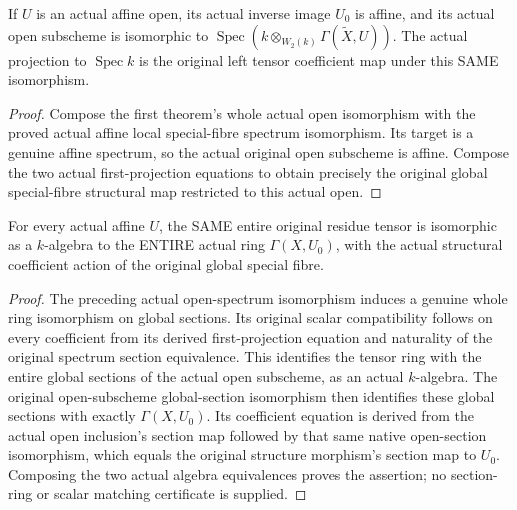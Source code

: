 \begin{theorem}
\label{thm:witt-two-special-fibre-original-affine-open}
\leanok
If $U$ is an actual affine open, its actual inverse image $U_0$
is affine, and its actual open subscheme is isomorphic to
$\operatorname{Spec}(k\otimes_{W_2(k)}\Gamma(\widetilde X,U))$.
The actual projection to $\operatorname{Spec}k$ is the original
left tensor coefficient map under this SAME isomorphism.
\end{theorem}
\begin{proof}
Compose the first theorem's whole actual open isomorphism with
the proved actual affine local special-fibre spectrum isomorphism.
Its target is a genuine affine spectrum, so the actual original
open subscheme is affine. Compose the two actual first-projection
equations to obtain precisely the original global special-fibre
structural map restricted to this actual open.
\end{proof}

\begin{theorem}
\label{thm:witt-two-special-fibre-original-open-sections}
\leanok
For every actual affine $U$, the SAME entire original residue
tensor is isomorphic as a $k$-algebra to the ENTIRE actual ring
$\Gamma(X,U_0)$, with the actual structural coefficient action
of the original global special fibre.
\end{theorem}
\begin{proof}
The preceding actual open-spectrum isomorphism induces a genuine
whole ring isomorphism on global sections. Its original scalar
compatibility follows on every coefficient from its derived
first-projection equation and naturality of the original spectrum
section equivalence. This identifies the tensor ring with the
entire global sections of the actual open subscheme, as an
actual $k$-algebra. The original open-subscheme global-section
isomorphism then identifies these global sections with exactly
$\Gamma(X,U_0)$. Its coefficient equation is derived from the
actual open inclusion's section map followed by that same native
open-section isomorphism, which equals the original structure
morphism's section map to $U_0$. Composing the two actual algebra
equivalences proves the assertion; no section-ring or scalar
matching certificate is supplied.
\end{proof}


